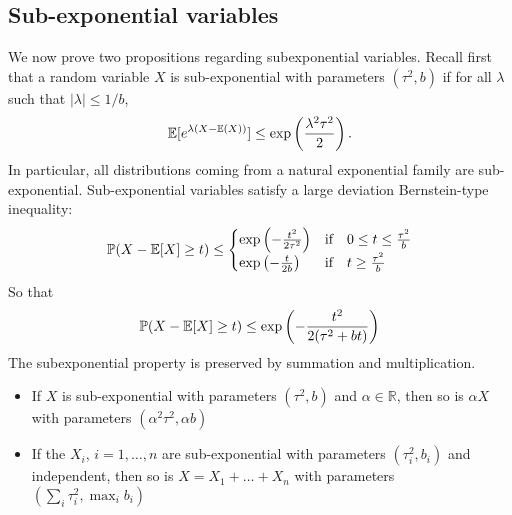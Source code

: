 \subsection{Sub-exponential variables}
We now prove two propositions regarding subexponential variables. 
Recall first that a random variable $X$ is  sub-exponential with parameters $(\tau^2, b)$ if for all $\lambda$ such that $|\lambda|\leq 1/b$,
\[
\mathbb{E}[e^{\lambda( X-\mathbb{E}(X))}] \leq \exp\left( \frac{\lambda^2 \tau^2}{2} \right).
\]
In particular, all distributions coming from a natural exponential family are sub-exponential. Sub-exponential variables satisfy a large deviation Bernstein-type inequality:
\begin{equation}
  \label{eq:concentration-subexponential}
  \Prob( X - \Esp[X] \geq t) \leq 
  \begin{cases} 
    \exp\left( - \frac{t^2}{2 \tau^2}\right)  & \text{if} \quad 0 \leq t \leq \frac{\tau^2}{b} \\ 
    \exp\left( - \frac{t}{2b}\right)  & \text{if} \quad t \geq \frac{\tau^2}{b}
  \end{cases}
\end{equation}
So that
\[
\mathbb{P}( X - \mathbb{E}[X] \geq t) \leq \exp\left( - \frac{t^2}{2(\tau^2+bt)}\right)
\]
The subexponential property is preserved by summation and multiplication. 
\begin{itemize}
\item If $X$ is sub-exponential with parameters $(\tau^2, b)$ and $\alpha \in \mathbb{R}$, then so is $\alpha X$ with parameters $(\alpha^2\tau^2, \alpha b)$
\item If the $X_i$, $i = 1,\dots,n$ are sub-exponential with parameters $(\tau_i^2, b_i)$ and independent, then so is $X = X_1 + \dots + X_n$ with parameters $(\sum_i \tau_i^2,\max_i b_i)$
\end{itemize}


